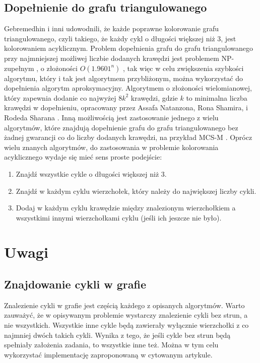 \documentclass{article}
\begin{document}
\subsection{Dopełnienie do grafu triangulowanego}
Gebremedhin i inni udowodnili, że każde poprawne kolorowanie grafu triangulowanego, czyli takiego, że każdy cykl o długości większej niż 3, jest kolorowaniem acyklicznym. \cite{Gb}
Problem dopełnienia grafu do grafu triangulowanego przy najmniejszej możliwej liczbie dodanych krawędzi jest problemem NP-zupełnym \cite{NPC}, o złożoności $O(1.9601^n)$ \cite{Cmp}, tak więc w celu zwiększenia szybkości algorytmu, który i tak jest algorytmem przybliżonym, można wykorzystać do dopełnienia algorytm aproksymacyjny. Algorytmem o złożoności wielomianowej, który zapewnia dodanie co najwyżej $8k^2$ krawędzi, gdzie $k$ to minimalna liczba krawędzi w dopełnieniu, opracowany przez Assafa Natanzona, Rona Shamira, i Rodeda Sharana \cite{Approx}. Inną możliwością jest zastosowanie jednego z wielu algorytmów, które znajdują dopełnienie grafu do grafu triangulowanego bez żadnej gwarancji co do liczby dodanych krawędzi, na przykład MCS-M \cite{MCS-M}. Oprócz wielu znanych algorytmów, do zastosowania w problemie kolorowania acyklicznego wydaje się mieć sens proste podejście:
\begin{enumerate}
\item Znajdź wszystkie cykle o długości większej niż 3.
\item Znajdź w każdym cyklu wierzchołek, który należy do największej liczby cykli.
\item Dodaj w każdym cyklu krawędzie między znalezionym wierzchołkiem a wszystkimi innymi wierzchołkami cyklu (jeśli ich jeszcze nie było).

\end{enumerate}
\section{Uwagi}
\subsection{Znajdowanie cykli w grafie}
Znalezienie cykli w grafie jest częścią każdego z opisanych algorytmów. 
Warto zauważyć, że w opisywanym problemie wystarczy znalezienie cykli bez strun, a nie wszystkich. Wszystkie inne cykle będą zawierały wyłącznie wierzchołki z co najmniej dwóch takich cykli. 
Wynika z tego, że jeśli cykle bez strun będą spełniały założenia zadania, to wszystkie inne też.
Można w tym celu wykorzystać implementację zaproponowaną w cytowanym artykule\cite{Cycle}.
\end{document}
